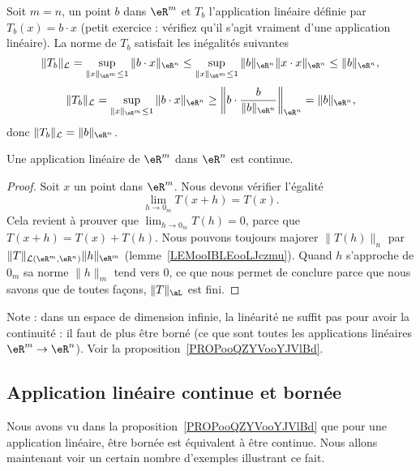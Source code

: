 \begin{example}
  Soit $m=n$, un point $b$ dans $\eR^m$ et $T_b$ l'application linéaire définie par $T_b(x)=b\cdot x$ (petit exercice : vérifiez qu'il s'agit vraiment d'une application linéaire).  La norme de $T_b$ satisfait les inégalités suivantes
 \[
\|T_b\|_{\mathcal{L}}=\sup_{\|x\|_{\eR^m}\leq 1}\|b\cdot x\|_{\eR^n}\leq \sup_{\|x\|_{\eR^m}\leq 1}\|b \|_{\eR^n}\|x\cdot x\|_{\eR^n}\leq\|b \|_{\eR^n},
\]
\[
\|T_b\|_{\mathcal{L}}=\sup_{\|x\|_{\eR^m}\leq 1}\|b\cdot x\|_{\eR^n}\geq \left\|b\cdot \frac{b}{\|b \|_{\eR^n}}\right\|_{\eR^n}=\|b \|_{\eR^n},
\]
donc $\|T_b\|_{\mathcal{L}}=\|b \|_{\eR^n}$.
\end{example}

\begin{proposition}
    Une application linéaire de \( \eR^m\) dans \( \eR^n\) est continue.
\end{proposition}

\begin{proof}
      Soit $x$ un point dans $\eR^m$. Nous devons vérifier l'égalité
      \begin{equation}
       \lim_{h\to 0_m}T(x+h)=T(x).
      \end{equation}
      Cela revient à prouver que $\lim_{h\to 0_m}T(h)=0$, parce que $T(x+h)=T(x)+T(h)$. Nous pouvons toujours majorer $\|T(h)\|_n$ par $\|T\|_{\mathcal{L}(\eR^m,\eR^n)}\| h \|_{\eR^m}$ (lemme~\ref{LEMooIBLEooLJczmu}). Quand $h$ s'approche de $ 0_m $ sa norme $\|h\|_m$ tend vers $0$, ce que nous permet de conclure parce que nous savons que de toutes façons, $\| T \|_{\aL}$ est fini.
\end{proof}

Note : dans un espace de dimension infinie, la linéarité ne suffit pas pour avoir la continuité : il faut de plus être borné (ce que sont toutes les applications linéaires \( \eR^m\to\eR^n\)). Voir la proposition~\ref{PROPooQZYVooYJVlBd}.

\subsection{Application linéaire continue et bornée}

Nous avons vu dans la proposition~\ref{PROPooQZYVooYJVlBd} que pour une application linéaire, être bornée est équivalent à être continue. Nous allons maintenant voir un certain nombre d'exemples illustrant ce fait.

